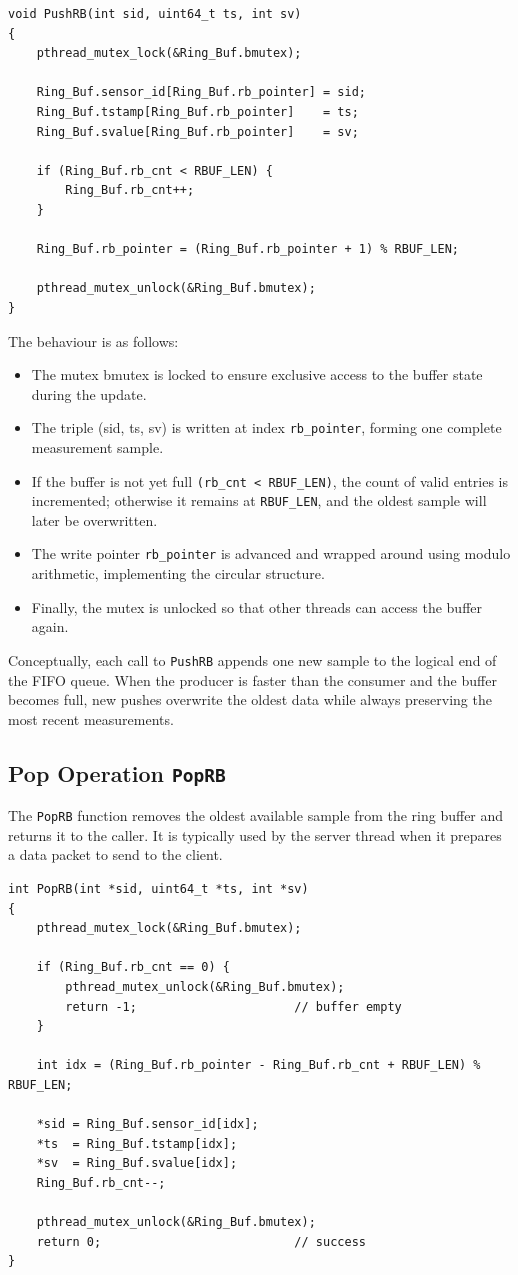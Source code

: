 \begin{verbatim}
void PushRB(int sid, uint64_t ts, int sv)
{
    pthread_mutex_lock(&Ring_Buf.bmutex);

    Ring_Buf.sensor_id[Ring_Buf.rb_pointer] = sid;
    Ring_Buf.tstamp[Ring_Buf.rb_pointer]    = ts;
    Ring_Buf.svalue[Ring_Buf.rb_pointer]    = sv;

    if (Ring_Buf.rb_cnt < RBUF_LEN) {
        Ring_Buf.rb_cnt++;
    }

    Ring_Buf.rb_pointer = (Ring_Buf.rb_pointer + 1) % RBUF_LEN;

    pthread_mutex_unlock(&Ring_Buf.bmutex);
}
\end{verbatim}
The behaviour is as follows:
\begin{itemize}
\item The mutex bmutex is locked to ensure exclusive access to the buffer state during the update.
\item The triple (sid, ts, sv) is written at index \texttt{rb\_pointer}, forming one complete measurement sample.
\item If the buffer is not yet full \texttt{(rb\_cnt < RBUF\_LEN)}, the count of valid entries is incremented; otherwise it remains at \texttt{RBUF\_LEN}, and the oldest sample will later be overwritten.
\item The write pointer \texttt{rb\_pointer} is advanced and wrapped around using modulo arithmetic, implementing the circular structure.
\item Finally, the mutex is unlocked so that other threads can access the buffer again.
\end{itemize}
Conceptually, each call to \texttt{PushRB} appends one new sample to the logical end of the FIFO queue. When the producer is faster than the consumer and the buffer becomes full, new pushes overwrite the oldest data while always preserving the most recent measurements.

\subsection{Pop Operation \texttt{PopRB}}
The \texttt{PopRB} function removes the oldest available sample from the ring buffer and returns it to the caller. It is typically used by the server thread when it prepares a data packet to send to the client.

\begin{verbatim}
int PopRB(int *sid, uint64_t *ts, int *sv)
{
    pthread_mutex_lock(&Ring_Buf.bmutex);

    if (Ring_Buf.rb_cnt == 0) {
        pthread_mutex_unlock(&Ring_Buf.bmutex);
        return -1;                      // buffer empty
    }

    int idx = (Ring_Buf.rb_pointer - Ring_Buf.rb_cnt + RBUF_LEN) % RBUF_LEN;

    *sid = Ring_Buf.sensor_id[idx];
    *ts  = Ring_Buf.tstamp[idx];
    *sv  = Ring_Buf.svalue[idx];
    Ring_Buf.rb_cnt--;

    pthread_mutex_unlock(&Ring_Buf.bmutex);
    return 0;                           // success
}
\end{verbatim}

